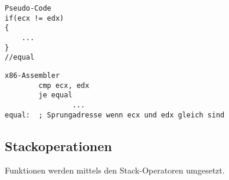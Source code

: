 \begin{verbatim}Pseudo-Code
if(ecx != edx)
{
	...
}
//equal
\end{verbatim}

\begin{verbatim}x86-Assembler
        cmp ecx, edx
        je equal
				...
equal:  ; Sprungadresse wenn ecx und edx gleich sind 
\end{verbatim}



\subsection{Stackoperationen}
Funktionen werden mittels den Stack-Operatoren umgesetzt. 
